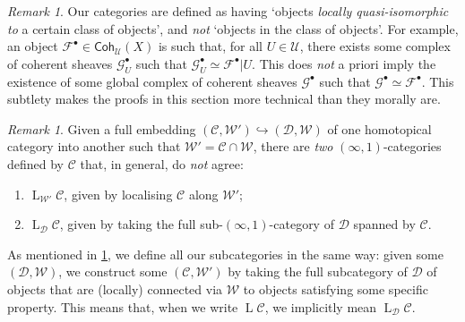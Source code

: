 \documentclass[11pt,fleqn]{article}
\theoremstyle{plain}
\theoremstyle{definition}
\theoremstyle{remark}
\newtheorem{remark}[theorem]{Remark}
\numberwithin{equation}{theorem}
\newcommand{\cover}{\mathcal{U}}
\newcommand{\restricted}{\mathbin{\big\vert}}
\newcommand{\gcohUX}{\mathsf{Coh}_{\cover}(X)}
\newcommand{\gccohX}{\mathsf{CCoh}(X)}
\DeclareMathOperator{\LL}{L}
\begin{document}
        \begin{remark}\label{remark:subcats-are-locally-q-iso-to}
            Our categories are defined as having `objects \emph{locally quasi-isomorphic to} a certain class of objects', and \emph{not} `objects in the class of objects'.
            For example, an object $\mathscr{F}^\bullet\in\gcohUX$ is such that, for all $U\in\cover$, there exists some complex of coherent sheaves $\mathscr{G}_U^\bullet$ such that $\mathscr{G}_U^\bullet\simeq \mathscr{F}^\bullet\restricted U$.
            This does \emph{not} a priori imply the existence of some global complex of coherent sheaves $\mathscr{G}^\bullet$ such that $\mathscr{G}^\bullet\simeq\mathscr{F}^\bullet$.
            This subtlety makes the proofs in this section more technical than they morally are.
        \end{remark}

        \begin{remark}
            Given a full embedding $(\mathcal{C},\mathcal{W}')\hookrightarrow(\mathcal{D},\mathcal{W})$ of one homotopical category into another such that $\mathcal{W}'=\mathcal{C}\cap\mathcal{W}$, there are \emph{two} $(\infty,1)$-categories defined by $\mathcal{C}$ that, in general, do \emph{not} agree:
            \begin{enumerate}
                \item $\LL_{\mathcal{W}'}{\mathcal{C}}$, given by localising $\mathcal{C}$ along $\mathcal{W}'$;
                \item $\LL_\mathcal{D}{\mathcal{C}}$, given by taking the full sub-$(\infty,1)$-category of $\mathcal{D}$ spanned by $\mathcal{C}$.
            \end{enumerate}
            As mentioned in \cref{remark:subcats-are-locally-q-iso-to}, we define all our subcategories in the same way: given some $(\mathcal{D},\mathcal{W})$, we construct some $(\mathcal{C},\mathcal{W}')$ by taking the full subcategory of $\mathcal{D}$ of objects that are (locally) connected via $\mathcal{W}$ to objects satisfying some specific property.
            This means that, when we write $\LL{\mathcal{C}}$, we implicitly mean $\LL_\mathcal{D}{\mathcal{C}}$.
        \end{remark}
\end{document}
